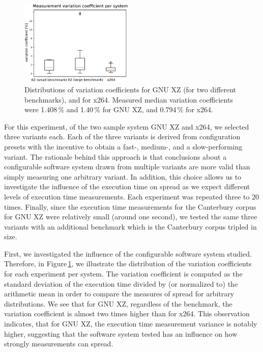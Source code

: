 \begin{figure}
 \begin{center}
   \vspace{-1cm}
   \includegraphics[width=0.48\textwidth]{images/reliability_1.eps}
 \end{center}
 \caption{Distributions of variation coefficients for
 GNU XZ (for two different benchmarks), and for x264.
 Measured median variation coefficients were
 1.408\,\% and 1.40\,\% for GNU XZ, and 0.794\,\% for
 x264.}\label{fig:reliability_1}
\end{figure}

For this experiment, of the two
sample system GNU XZ and x264, we selected three variants each. Each of the
three variants is derived from configuration presets with the incentive to
obtain a fast-,  medium-, and a slow-performing variant. The rationale behind this
approach is that conclusions about a configurable software system drawn from
multiple variants are more valid than simply measuring one arbitrary variant.
In addition, this choice allows us to investigate the influence of the
execution time on spread as we expect different levels of execution time
measurements. Each experiment was repeated three to 20 times. Finally, since
the execution time measurements for the Canterbury corpus for GNU XZ were
relatively small (around one second), we tested the same three variants with an
additional benchmark which is the Canterbury corpus tripled in size.

First, we investigated the influence of the configurable software system
studied. Therefore, in Figure\,\ref{fig:reliability_1}, we illustrate the
distribution of the variation coefficients for each experiment per system. The variation
coefficient is computed as the  standard deviation of the execution time divided
by (or normalized to) the arithmetic mean in order to compare the measures of
spread for arbitrary distributions. 
We see that for GNU XZ, regardless of the benchmark, the variation coefficient
is almost two times higher than for x264. This observation indicates, that for
GNU XZ, the execution time measurement variance is notably higher, suggesting
that the software system tested has an influence on how strongly measurements
can spread.


